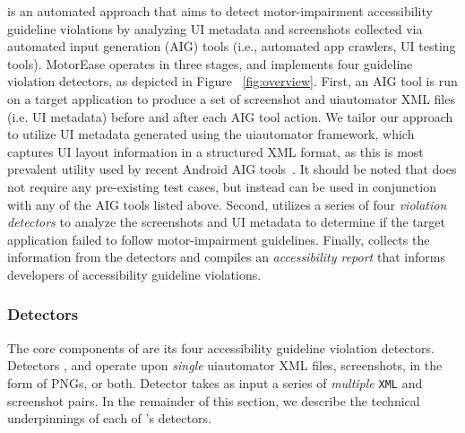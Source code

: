 \MotorEase is an automated approach that aims to detect motor-impairment accessibility guideline violations by analyzing UI metadata and screenshots collected via automated input generation (AIG) tools (i.e., automated app crawlers, UI testing tools). MotorEase operates in three stages, and implements four guideline violation detectors, as depicted in Figure ~\ref{fig:overview}. First, an AIG tool is run on a target application to produce a set of screenshot and uiautomator XML files (i.e. UI metadata) before and after each AIG tool action. We tailor our approach to utilize UI metadata generated using the uiautomator framework, which captures UI layout information in a structured XML format, as this is most prevalent utility used by recent Android AIG tools~\cite{mao2016sapienz,li2017droidbot,Gu:ICSE'19,Moran:ICST'16,crashscope,Su:FSE'17,Linares:MSR15,Linares:ICSME'17,Linares:ICSME'17-2,Zhao:FSE22}. It should be noted that \MotorEase does not require any pre-existing test cases, but instead can be used in conjunction with any of the AIG tools listed above. Second, \MotorEase utilizes a series of four \textit{violation detectors} to analyze the screenshots and UI metadata to determine if the target application failed to follow motor-impairment guidelines. Finally, \MotorEase collects the information from the detectors and compiles an \textit{accessibility report} that informs developers of accessibility guideline violations.



\subsubsection{Detectors}

The core components of \MotorEase are its four accessibility guideline violation detectors. Detectors ,  and  operate upon \textit{single} uiautomator XML files, screenshots, in the form of PNGs, or both. Detector  takes as input a series of \textit{multiple} \texttt{\small XML} and screenshot pairs. In the remainder of this section, we describe the technical underpinnings of each of \MotorEase's detectors.




